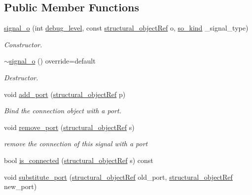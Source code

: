 \subsection*{Public Member Functions}
\begin{DoxyCompactItemize}
\item 
\hyperlink{classsignal__o_a3c1e51b33b28b50c084945f21878e104}{signal\+\_\+o} (int \hyperlink{classstructural__object_ac2744292aa7f0fca3742133d16bb3201}{debug\+\_\+level}, const \hyperlink{structural__objects_8hpp_a8ea5f8cc50ab8f4c31e2751074ff60b2}{structural\+\_\+object\+Ref} o, \hyperlink{structural__objects_8hpp_acf52399aecacb7952e414c5746ce6439}{so\+\_\+kind} \+\_\+signal\+\_\+type)
\begin{DoxyCompactList}\small\item\em Constructor. \end{DoxyCompactList}\item 
\hyperlink{classsignal__o_a8aba12025f935a5b22de7a5a79e492c5}{$\sim$signal\+\_\+o} () override=default
\begin{DoxyCompactList}\small\item\em Destructor. \end{DoxyCompactList}\item 
void \hyperlink{classsignal__o_aea73b187bccd2428fb0698638e657bdd}{add\+\_\+port} (\hyperlink{structural__objects_8hpp_a8ea5f8cc50ab8f4c31e2751074ff60b2}{structural\+\_\+object\+Ref} p)
\begin{DoxyCompactList}\small\item\em Bind the connection object with a port. \end{DoxyCompactList}\item 
void \hyperlink{classsignal__o_a2296b17243e311d4df0467fda98392ed}{remove\+\_\+port} (\hyperlink{structural__objects_8hpp_a8ea5f8cc50ab8f4c31e2751074ff60b2}{structural\+\_\+object\+Ref} s)
\begin{DoxyCompactList}\small\item\em remove the connection of this signal with a port \end{DoxyCompactList}\item 
bool \hyperlink{classsignal__o_ab42568a021cd2e88bb2ce03b89dcb89b}{is\+\_\+connected} (\hyperlink{structural__objects_8hpp_a8ea5f8cc50ab8f4c31e2751074ff60b2}{structural\+\_\+object\+Ref} s) const
\item 
void \hyperlink{classsignal__o_a0d121c5524b4f35e710da41023cb780a}{substitute\+\_\+port} (\hyperlink{structural__objects_8hpp_a8ea5f8cc50ab8f4c31e2751074ff60b2}{structural\+\_\+object\+Ref} old\+\_\+port, \hyperlink{structural__objects_8hpp_a8ea5f8cc50ab8f4c31e2751074ff60b2}{structural\+\_\+object\+Ref} new\+\_\+port)

\end{DoxyCompactItemize}
